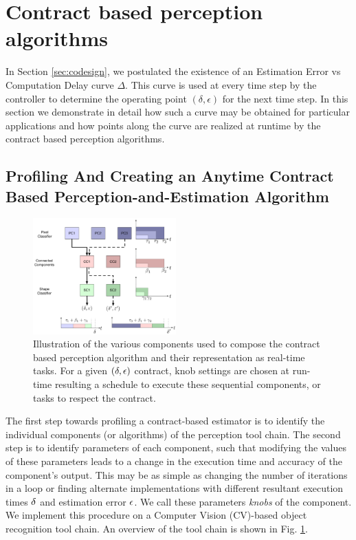 \section{Contract based perception algorithms}
\label{delayErrorCurve}

In Section \ref{sec:codesign}, we postulated the existence of an Estimation Error vs Computation Delay curve $\Delta$. %
This curve is used at every time step by the controller to determine the operating point $(\delta,\epsilon)$ for the next time step.
In this section we demonstrate in detail how such a curve may be obtained for particular applications and how points along the curve are realized at runtime by the contract based perception algorithms.

\subsection{Profiling And Creating an Anytime Contract Based Perception-and-Estimation Algorithm}
\begin{figure}[htbp]
	\centering
	\includegraphics[width=0.49\textwidth]{figures/omnigraffle_figures/real_time_figure}
	\caption{Illustration of the various components used to compose the contract based perception algorithm and their representation as real-time tasks. For a given $(\delta,\epsilon)$ contract, knob settings are chosen at run-time resulting a schedule to execute these sequential components, or tasks to respect the contract.}
	\label{fig:RT_bs}
\end{figure}
The first step towards profiling a contract-based estimator is to identify the individual components (or algorithms) of the perception tool chain. 
The second step is to identify parameters of each component, such that modifying the values of these parameters leads to a change in the execution time and accuracy of the component's output.
This may be as simple as changing the number of iterations in a loop \cite{loop-perf} or finding alternate implementations with different resultant execution times $\delta$ and estimation error $\epsilon$.
We call these parameters \emph{knobs} of the component.
We implement this procedure on a Computer Vision (CV)-based object recognition tool chain. 
An overview of the tool chain is shown in Fig. \ref{fig:RT_bs}.

